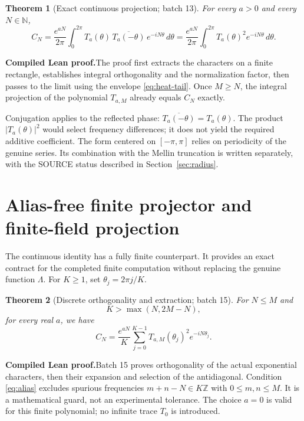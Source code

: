 \documentclass[11pt,a4paper]{article}
\newtheorem{theorem}{Theorem}[section]
\theoremstyle{remark}
\newcommand{\Lam}{\Lambda}
\newcommand{\N}{\mathbb N}
\newcommand{\Z}{\mathbb Z}
\newcommand{\paid}{\textbf{Compiled Lean proof.}\space}
\begin{document}
\begin{theorem}[Exact continuous projection; batch 13]\label{thm:circle}
For every $a>0$ and every $N\in\N$,
\begin{equation}\label{eq:circle}
C_N=\frac{e^{aN}}{2\pi}\int_0^{2\pi}
T_a(\theta)\,\overline{T_a(-\theta)}\,e^{-iN\theta}\,d\theta
=\frac{e^{aN}}{2\pi}\int_0^{2\pi}T_a(\theta)^2e^{-iN\theta}\,d\theta.
\end{equation}
\end{theorem}
\paid The proof first extracts the characters on a finite rectangle,
establishes integral orthogonality and the normalization factor, then passes
to the limit using the envelope \eqref{eq:heat-tail}. Once $M\ge N$, the
integral projection of the polynomial $T_{a,M}$ already equals $C_N$ exactly.

Conjugation applies to the reflected phase:
$\overline{T_a(-\theta)}=T_a(\theta)$. The product $|T_a(\theta)|^2$
would select frequency differences; it does not yield the required additive
coefficient. The form centered on $[-\pi,\pi]$ relies on periodicity of the
genuine series. Its combination with the Mellin truncation is written
separately, with the SOURCE status described in Section~\ref{sec:radius}.

\clearpage
\section{Alias-free finite projector and finite-field projection}\label{sec:finite}
The continuous identity has a fully finite counterpart. It provides an exact
contract for the completed finite computation without replacing the genuine function
$\Lam$. For $K\ge1$, set $\theta_j=2\pi j/K$.

\begin{theorem}[Discrete orthogonality and extraction; batch 15]
For $N\le M$ and
\begin{equation}\label{eq:alias}
K>\max(N,2M-N),
\end{equation}
for every real $a$, we have
\begin{equation}\label{eq:discrete}
C_N=\frac{e^{aN}}{K}\sum_{j=0}^{K-1}
T_{a,M}(\theta_j)^2e^{-iN\theta_j}.
\end{equation}
\end{theorem}
\paid Batch 15 proves orthogonality of the actual exponential characters,
then their expansion and selection of the antidiagonal. Condition
\eqref{eq:alias} excludes spurious frequencies $m+n-N\in K\Z$ with
$0\le m,n\le M$. It is a mathematical guard, not an experimental tolerance.
The choice $a=0$ is valid for this finite polynomial; no infinite trace
$T_0$ is introduced.
\end{document}
